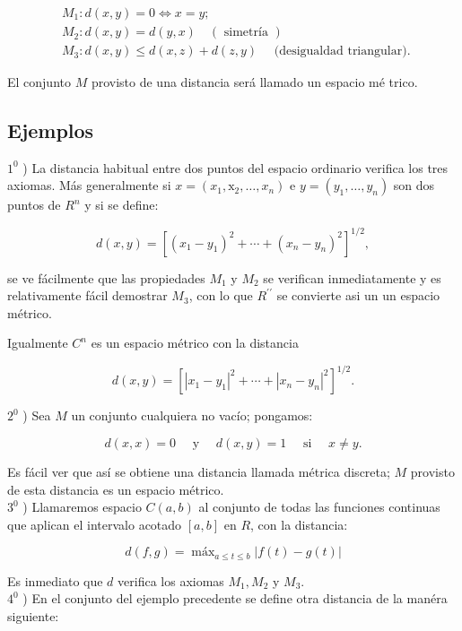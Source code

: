 \documentclass[10pt]{article}
\theoremstyle{plain}
\theoremstyle{definition}
\theoremstyle{remark}
\begin{document}
$$
\begin{aligned}
& M_{1}: d(x, y)=0 \Leftrightarrow x=y ; \\
& M_{2}: d(x, y)=d(y, x) \quad(\text { simetría }) \\
& M_{3}: d(x, y) \leqslant d(x, z)+d(z, y) \quad \text { (desigualdad triangular). }
\end{aligned}
$$

El conjunto $M$ provisto de una distancia será llamado un espacio mé trico.

\subsection*{Ejemplos}
$1^{0}$ ) La distancia habitual entre dos puntos del espacio ordinario verifica los tres axiomas. Más generalmente si $x=\left(x_{1}, \mathrm{x}_{2}, \ldots, x_{n}\right)$ e $y=\left(y_{1}, \ldots, y_{n}\right)$ son dos puntos de $R^{n}$ y si se define:


\begin{equation*}
d(x, y)=\left[\left(x_{1}-y_{1}\right)^{2}+\cdots+\left(x_{n}-y_{n}\right)^{2}\right]^{1 / 2}, \tag{1-1}
\end{equation*}


se ve fácilmente que las propiedades $M_{1}$ y $M_{2}$ se verifican inmediatamente y es relativamente fácil demostrar $M_{3}$, con lo que $R^{\prime \prime}$ se convierte asi un un espacio métrico.

Igualmente $C^{n}$ es un espacio métrico con la distancia

$$
d(x, y)=\left[\left|x_{1}-y_{1}\right|^{2}+\cdots+\left|x_{n}-y_{n}\right|^{2}\right]^{1 / 2} .
$$

$2^{0}$ ) Sea $M$ un conjunto cualquiera no vacío; pongamos:

$$
d(x, x)=0 \quad \text { y } \quad d(x, y)=1 \quad \text { si } \quad x \neq y .
$$

Es fácil ver que así se obtiene una distancia llamada métrica discreta; $M$ provisto de esta distancia es un espacio métrico.\\
$3^{0}$ ) Llamaremos espacio $C(a, b)$ al conjunto de todas las funciones continuas que aplican el intervalo acotado $[a, b]$ en $R$, con la distancia:


\begin{equation*}
d(f, g)=\operatorname{máx}_{a \leqslant t \leqslant b}|f(t)-g(t)| \tag{$1\cdot2$}
\end{equation*}


Es inmediato que $d$ verifica los axiomas $M_{1}, M_{2}$ y $M_{3}$.\\
$4^{0}$ ) En el conjunto del ejemplo precedente se define otra distancia de la manéra siguiente:
\end{document}
